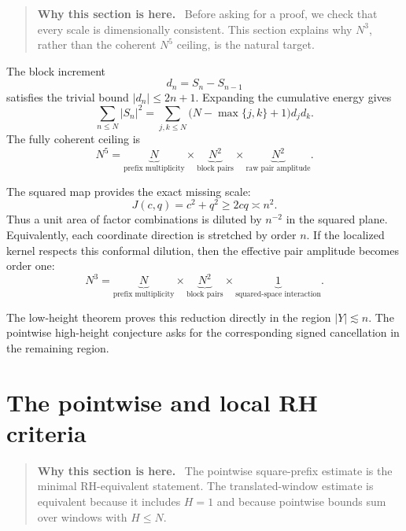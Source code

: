 \documentclass[11pt]{article}
\theoremstyle{definition}
\theoremstyle{remark}
\newcommand{\1}{\mathbf{1}}
\newenvironment{motivation}
  {\begin{quote}\small\color{ovvogray}\textbf{Why this section is here.}\ }
  {\end{quote}}
\begin{document}
\begin{motivation}
Before asking for a proof, we check that every scale is dimensionally consistent.  This section explains why $N^3$, rather than the coherent $N^5$ ceiling, is the natural target.
\end{motivation}

The block increment
\begin{equation}
 d_n=S_n-S_{n-1}
 \label{eq:d-n}
\end{equation}
satisfies the trivial bound $|d_n|\le2n+1$.  Expanding the cumulative energy gives
\begin{equation}
 \sum_{n\le N}|S_n|^2
 =
 \sum_{j,k\le N}
 \bigl(N-\max\{j,k\}+1\bigr)d_jd_k.
 \label{eq:triangular-energy}
\end{equation}
The fully coherent ceiling is
\begin{equation}
 N^5
 =
 \underbrace{N}_{\text{prefix multiplicity}}
 \times
 \underbrace{N^2}_{\text{block pairs}}
 \times
 \underbrace{N^2}_{\text{raw pair amplitude}}.
 \label{eq:N5-accounting}
\end{equation}

The squared map provides the exact missing scale:
\begin{equation}
 J(c,q)=c^2+q^2\ge2cq\asymp n^2.
 \label{eq:two-power-J}
\end{equation}
Thus a unit area of factor combinations is diluted by $n^{-2}$ in the squared plane.  Equivalently, each coordinate direction is stretched by order $n$.  If the localized kernel respects this conformal dilution, then the effective pair amplitude becomes order one:
\begin{equation}
 N^3
 =
 \underbrace{N}_{\text{prefix multiplicity}}
 \times
 \underbrace{N^2}_{\text{block pairs}}
 \times
 \underbrace{1}_{\text{squared-space interaction}}.
 \label{eq:N3-accounting}
\end{equation}

The low-height theorem proves this reduction directly in the region $|Y|\lesssim n$.  The pointwise high-height conjecture asks for the corresponding signed cancellation in the remaining region.

\section{The pointwise and local RH criteria}
\label{sec:local-criterion}

\begin{motivation}
The pointwise square-prefix estimate is the minimal RH-equivalent statement.  The translated-window estimate is equivalent because it includes $H=1$ and because pointwise bounds sum over windows with $H\le N$.
\end{motivation}
\end{document}
